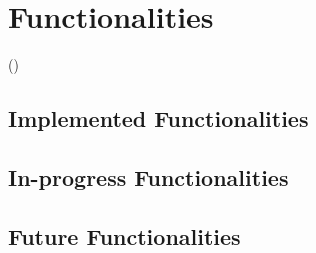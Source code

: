 \section{Functionalities}
(\vp)




\subsection{Implemented Functionalities}

\subsection{In-progress Functionalities}

\subsection{Future Functionalities}
